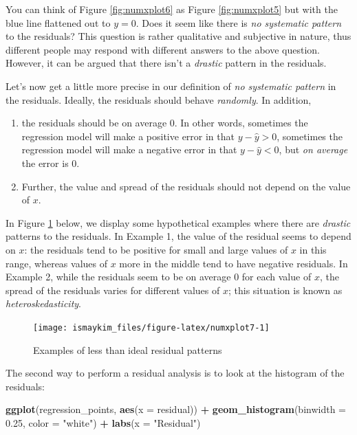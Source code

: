 \documentclass[12pt, krantz2,]{krantz}
\makeatletter
\newenvironment{Shaded}{\begin{snugshade}}{\end{snugshade}}
\newcommand{\DataTypeTok}[1]{\textcolor[rgb]{0.27,0.27,0.27}{#1}}
\newcommand{\FloatTok}[1]{\textcolor[rgb]{0.06,0.06,0.06}{#1}}
\newcommand{\KeywordTok}[1]{\textcolor[rgb]{0.27,0.27,0.27}{\textbf{#1}}}
\newcommand{\NormalTok}[1]{#1}
\newcommand{\OperatorTok}[1]{\textcolor[rgb]{0.43,0.43,0.43}{\textbf{#1}}}
\newcommand{\StringTok}[1]{\textcolor[rgb]{0.5,0.5,0.5}{#1}}
\providecommand{\tightlist}{%
  \setlength{\itemsep}{0pt}\setlength{\parskip}{0pt}}
\newenvironment{kframe}{%
\medskip{}
\setlength{\fboxsep}{.8em}
 \def\at@end@of@kframe{}%
 \ifinner\ifhmode%
  \def\at@end@of@kframe{\end{minipage}}%
  \begin{minipage}{\columnwidth}%
 \fi\fi%
 \def\FrameCommand##1{\hskip\@totalleftmargin \hskip-\fboxsep
 \colorbox{shadecolor}{##1}\hskip-\fboxsep
     \hskip-\linewidth \hskip-\@totalleftmargin \hskip\columnwidth}%
 \MakeFramed {\advance\hsize-\width
   \@totalleftmargin\z@ \linewidth\hsize
   \@setminipage}}%
 {\par\unskip\endMakeFramed%
 \at@end@of@kframe}
\renewenvironment{Shaded}{\begin{kframe}}{\end{kframe}}
\makeatother
\begin{document}
You can think of Figure \ref{fig:numxplot6} as Figure \ref{fig:numxplot5} but with the blue line flattened out to \(y=0\). Does it seem like there is \emph{no systematic pattern} to the residuals? This question is rather qualitative and subjective in nature, thus different people may respond with different answers to the above question. However, it can be argued that there isn't a \emph{drastic} pattern in the residuals.

Let's now get a little more precise in our definition of \emph{no systematic pattern} in the residuals. Ideally, the residuals should behave \emph{randomly}. In addition,

\begin{enumerate}
\def\labelenumi{\arabic{enumi}.}
\tightlist
\item
  the residuals should be on average 0. In other words, sometimes the regression model will make a positive error in that \(y - \widehat{y} > 0\), sometimes the regression model will make a negative error in that \(y - \widehat{y} < 0\), but \emph{on average} the error is 0.
\item
  Further, the value and spread of the residuals should not depend on the value of \(x\).
\end{enumerate}

In Figure \ref{fig:numxplot7} below, we display some hypothetical examples where there are \emph{drastic} patterns to the residuals. In Example 1, the value of the residual seems to depend on \(x\): the residuals tend to be positive for small and large values of \(x\) in this range, whereas values of \(x\) more in the middle tend to have negative residuals. In Example 2, while the residuals seem to be on average 0 for each value of \(x\), the spread of the residuals varies for different values of \(x\); this situation is known as \emph{heteroskedasticity}.

\begin{figure}

{\centering \texttt{[image: ismaykim\_files/figure-latex/numxplot7-1]} 

}

\caption{Examples of less than ideal residual patterns}\label{fig:numxplot7}
\end{figure}

The second way to perform a residual analysis is to look at the histogram of the residuals:

\begin{Shaded}
\begin{Highlighting}[]
\KeywordTok{ggplot}\NormalTok{(regression_points, }\KeywordTok{aes}\NormalTok{(}\DataTypeTok{x =}\NormalTok{ residual)) }\OperatorTok{+}
\StringTok{  }\KeywordTok{geom_histogram}\NormalTok{(}\DataTypeTok{binwidth =} \FloatTok{0.25}\NormalTok{, }\DataTypeTok{color =} \StringTok{"white"}\NormalTok{) }\OperatorTok{+}
\StringTok{  }\KeywordTok{labs}\NormalTok{(}\DataTypeTok{x =} \StringTok{"Residual"}\NormalTok{)}
\end{Highlighting}
\end{Shaded}
\end{document}
